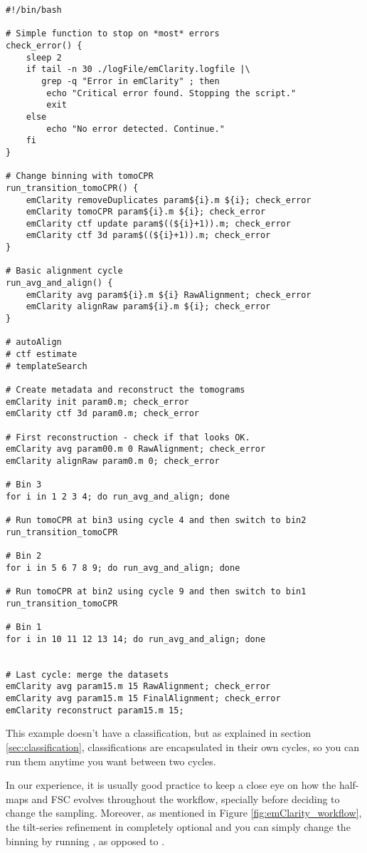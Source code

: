 \begin{lstlisting}[basicstyle=\footnotesize\ttfamily]
#!/bin/bash

# Simple function to stop on *most* errors
check_error() {
    sleep 2
    if tail -n 30 ./logFile/emClarity.logfile |\
       grep -q "Error in emClarity" ; then
	    echo "Critical error found. Stopping the script."
	    exit
    else
	    echo "No error detected. Continue."
    fi
}

# Change binning with tomoCPR
run_transition_tomoCPR() {
    emClarity removeDuplicates param${i}.m ${i}; check_error
    emClarity tomoCPR param${i}.m ${i}; check_error
    emClarity ctf update param$((${i}+1)).m; check_error
    emClarity ctf 3d param$((${i}+1)).m; check_error
}

# Basic alignment cycle
run_avg_and_align() {
    emClarity avg param${i}.m ${i} RawAlignment; check_error
	emClarity alignRaw param${i}.m ${i}; check_error
}

# autoAlign
# ctf estimate
# templateSearch

# Create metadata and reconstruct the tomograms
emClarity init param0.m; check_error
emClarity ctf 3d param0.m; check_error

# First reconstruction - check if that looks OK.
emClarity avg param00.m 0 RawAlignment; check_error
emClarity alignRaw param0.m 0; check_error

# Bin 3
for i in 1 2 3 4; do run_avg_and_align; done

# Run tomoCPR at bin3 using cycle 4 and then switch to bin2
run_transition_tomoCPR

# Bin 2
for i in 5 6 7 8 9; do run_avg_and_align; done

# Run tomoCPR at bin2 using cycle 9 and then switch to bin1
run_transition_tomoCPR

# Bin 1
for i in 10 11 12 13 14; do run_avg_and_align; done


# Last cycle: merge the datasets
emClarity avg param15.m 15 RawAlignment; check_error
emClarity avg param15.m 15 FinalAlignment; check_error
emClarity reconstruct param15.m 15;
\end{lstlisting}

This example doesn't have a classification, but as explained in section \ref{sec:classification}, classifications are encapsulated in their own cycles, so you can run them anytime you want between two cycles.

In our experience, it is usually good practice to keep a close eye on how the half-maps and FSC evolves throughout the workflow, specially before deciding to change the sampling. Moreover, as mentioned in Figure \ref{fig:emClarity_workflow}, the tilt-series refinement in completely optional and you can simply change the binning by running , as opposed to .

